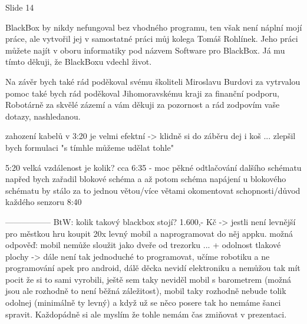 



Slide 14

BlackBox by nikdy nefungoval bez vhodného programu, ten však není náplní mojí práce,
ale vytvořil jej v samostatné práci můj kolega Tomáš Rohlínek. 
Jeho práci můžete najít v oboru informatiky pod názvem Software pro BlackBox.
Já mu tímto děkuji, že BlackBoxu vdechl život.

Na závěr bych také rád poděkoval svému školiteli Miroslavu Burdovi za vytrvalou pomoc %
také bych rád poděkoval Jihomoravskému kraji za finanční podporu, 
Robotárně za skvělé zázemí 
a vám děkuji za pozornost a rád zodpovím vaše dotazy, nashledanou.



zahození kabelů v 3:20 je velmi efektní -> klidně si do záběru dej i koš ... 
zlepšil bych formulaci "s tímhle můžeme udělat tohle" %

5:20 velká vzdálenost je kolik? %
cca 6:35 - moc pěkné odtlačování dalšího schématu 
napřed bych zařadil blokové schéma a až potom schéma napájení 
u blokového schématu by stálo za to jednou větou/více větami okomentovat schopnosti/důvod každého senzoru 
8:40  

-----------------
BtW: kolik takový blackbox stojí? 1.600,- Kč -> jestli není levnější 
pro městkou hru koupit 20x levný mobil a naprogramovat do něj appku.    
možná odpověď: mobil nemůže sloužit jako dveře od trezorku ...  + odolnost tlakové plochy -> dále není tak jednoduché to programovat, učíme robotiku a ne programování apek pro android, dálě děcka nevidí elektroniku a nemůžou tak mít pocit že si to sami vyrobili, ještě sem taky neviděl mobil s barometrem (možná jsou ale rozhodně to není běžná záležitost), mobil taky rozhodně nebude tolik odolnej (minimálně ty levný) a když už se něco posere tak ho nemáme šanci spravit. Každopádně si ale myslím že tohle nemám čas zmiňovat v prezentaci.